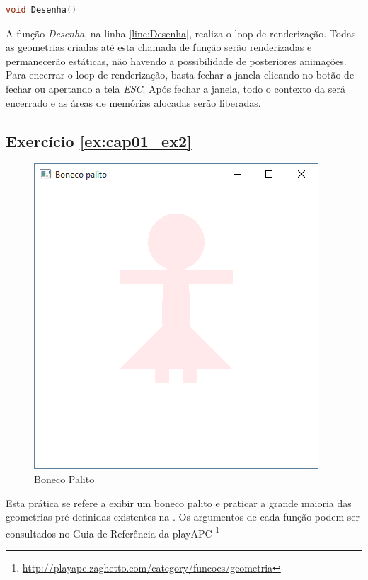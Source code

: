 \begin{lstlisting}[label={func:Desenha},language=C++]
void Desenha()
\end{lstlisting}
A função \emph{Desenha}, na linha \ref{line:Desenha}, realiza o loop de renderização. Todas as geometrias criadas até esta chamada de função serão renderizadas e permanecerão estáticas, não havendo a possibilidade de posteriores animações.
Para encerrar o loop de renderização, basta fechar a janela clicando no botão de fechar ou apertando a tela \emph{ESC}. Após fechar a janela, todo o contexto da \playAPC{} será encerrado e as áreas de memórias alocadas serão liberadas.

\subsection*{Exercício \ref{ex:cap01_ex2}}
\begin{figure}[ht]
  \centerline{\includegraphics[width=.5\textwidth]{img/cap1_ex3.png}}
  \caption{Boneco Palito}
  \label{fig:cap01_ex2}
\end{figure}
Esta prática se refere a exibir um boneco palito e praticar a grande maioria das geometrias pré-definidas existentes na \playAPC{}. Os argumentos de cada função podem ser consultados no Guia de Referência da playAPC{} \footnote{\url{http://playapc.zaghetto.com/category/funcoes/geometria}}


